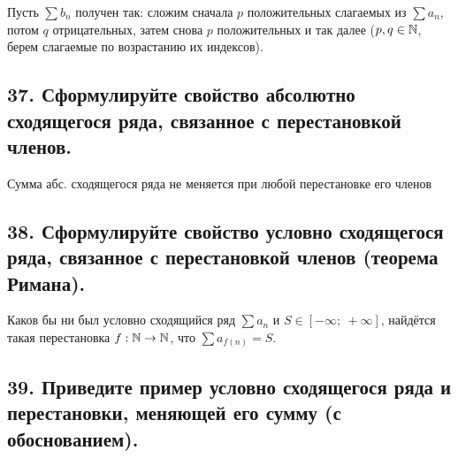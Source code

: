 \documentclass[a4paper, fleqn]{article}
\begin{document}
    Пусть $\sum b_n$ получен так: сложим сначала $p$ положительных слагаемых из $\sum a_n$, потом $q$ отрицательных, затем снова $p$ положительных и так далее ($p, q \in \mathbb{N}$, берем слагаемые по возрастанию их индексов).
    
    \subsection*{37. Сформулируйте свойство абсолютно сходящегося ряда, связанное с перестановкой членов.}
    \begin{proposition}
        Сумма абс. сходящегося ряда не меняется при любой перестановке его членов
    \end{proposition}
        
    \subsection*{38. Сформулируйте свойство условно сходящегося ряда, связанное с перестановкой членов (теорема Римана).}
    \begin{theorem}
        Каков бы ни был условно сходящийся ряд $\sum a_n$ и $S \in \left[-\infty;\ +\infty\right]$, найдётся такая перестановка $f: \mathbb{N} \to \mathbb{N}$, что $\sum a_{f(n)} = S$.
    \end{theorem}

        
    \subsection*{39. Приведите пример условно сходящегося ряда и перестановки, меняющей его сумму
    (с обоснованием).}
\end{document}
